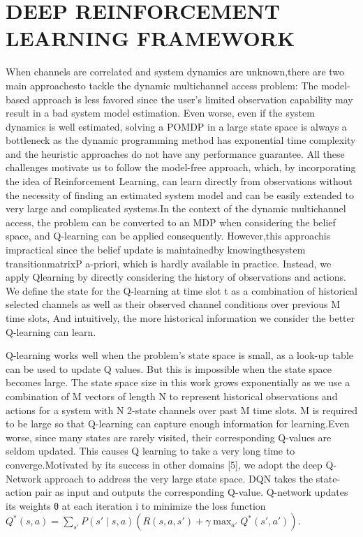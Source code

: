 \section*{  DEEP REINFORCEMENT LEARNING FRAMEWORK    }
When channels are correlated and system dynamics are unknown,there are two main approachesto tackle the dynamic multichannel access problem:  The model-based approach is less favored since the user’s limited observation capability may result in a bad system model estimation. Even worse, even if the system dynamics is well estimated, solving a POMDP in a large state space is always a bottleneck as the dynamic programming method has exponential time complexity and the heuristic approaches do not have any performance guarantee. All these challenges motivate us to follow the model-free approach, which, by incorporating the idea of Reinforcement Learning, can learn directly from observations without the necessity of ﬁnding an estimated system model and can be easily extended to very large and complicated systems.In the context of the dynamic multichannel access, the problem can be converted to an MDP when considering the belief space, and Q-learning can be applied consequently. However,this approachis impractical since the belief update is maintainedby knowingthesystem transitionmatrixP a-priori, which is hardly available in practice. Instead, we apply Qlearning by directly considering the history of observations and actions. We deﬁne the state for the Q-learning at time slot t as a combination of historical selected channels as well as their observed channel conditions over previous M time slots, And intuitively, the more historical information we consider the better Q-learning can learn.

Q-learning works well when the problem’s state space is small, as a look-up table can be used to update Q values. But this is impossible when the state space becomes large. The state space size in this work grows exponentially as we use a combination of M vectors of length N to represent historical observations and actions for a system with N 2-state channels over past M time slots. M is required to be large so that Q-learning can capture enough information for learning.Even worse, since many states are rarely visited, their corresponding Q-values are seldom updated. This causes Q learning to take a very long time to converge.Motivated by its success in other domains [5], we adopt the deep Q-Network approach to address the very large state space. DQN takes the state-action pair as input and outputs the corresponding Q-value. Q-network updates its weights θ at each iteration i to minimize the loss function $Q^{*}\left ( s,a \right )=\sum _{{s}'}P\left ( {s}'\mid s,a \right )\left ( R\left ( s,a,{s}' \right ) +\gamma\max _{{a}'}Q^{*}\left ( {s}' ,{a}'\right )\right )$.

